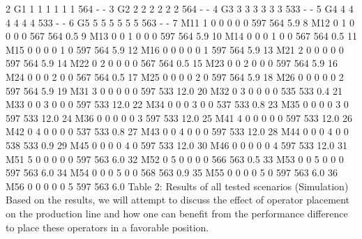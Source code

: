 2	G1	1	1	1	1	1	1	564	-	-
3	G2	2	2	2	2	2	2	564	-	-
4	G3	3	3	3	3	3	3	533	-	-
5	G4	4	4	4	4	4	4	533	-	-
6	G5	5	5	5	5	5	5	563	-	-
7	M11	1	0	0	0	0	0	597	564	5.9
8	M12	0	1	0	0	0	0	567	564	0.5
9	M13	0	0	1	0	0	0	597	564	5.9
10	M14	0	0	0	1	0	0	567	564	0.5
11	M15	0	0	0	0	1	0	597	564	5.9
12	M16	0	0	0	0	0	1	597	564	5.9
13	M21	2	0	0	0	0	0	597	564	5.9
14	M22	0	2	0	0	0	0	567	564	0.5
15	M23	0	0	2	0	0	0	597	564	5.9
16	M24	0	0	0	2	0	0	567	564	0.5
17	M25	0	0	0	0	2	0	597	564	5.9
18	M26	0	0	0	0	0	2	597	564	5.9
19	M31	3	0	0	0	0	0	597	533	12.0
20	M32	0	3	0	0	0	0	535	533	0.4
21	M33	0	0	3	0	0	0	597	533	12.0
22	M34	0	0	0	3	0	0	537	533	0.8
23	M35	0	0	0	0	3	0	597	533	12.0
24	M36	0	0	0	0	0	3	597	533	12.0
25	M41	4	0	0	0	0	0	597	533	12.0
26	M42	0	4	0	0	0	0	537	533	0.8
27	M43	0	0	4	0	0	0	597	533	12.0
28	M44	0	0	0	4	0	0	538	533	0.9
29	M45	0	0	0	0	4	0	597	533	12.0
30	M46	0	0	0	0	0	4	597	533	12.0
31	M51	5	0	0	0	0	0	597	563	6.0
32	M52	0	5	0	0	0	0	566	563	0.5
33	M53	0	0	5	0	0	0	597	563	6.0
34	M54	0	0	0	5	0	0	568	563	0.9
35	M55	0	0	0	0	5	0	597	563	6.0
36	M56	0	0	0	0	0	5	597	563	6.0
Table 2: Results of all tested scenarios (Simulation)
Based on the results, we will attempt to discuss the effect of operator placement on the production line and how one can benefit from the performance difference to place these operators in a favorable position.
 
